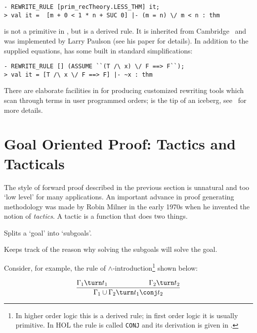 \begin{session}
\begin{verbatim}
- REWRITE_RULE [prim_recTheory.LESS_THM] it;
> val it =  [m + 0 < 1 * n + SUC 0] |- (m = n) \/ m < n : thm
\end{verbatim}
\end{session}

 is not a primitive in \HOL, but is a derived rule.
It is inherited from Cambridge \LCF\ and was implemented by Larry Paulson (see his paper \cite{lcp-rewrite} for details).
In addition to the supplied equations,  has some built in standard simplifications:

\begin{session}
\begin{verbatim}
- REWRITE_RULE [] (ASSUME ``(T /\ x) \/ F ==> F``);
> val it = [T /\ x \/ F ==> F] |- ~x : thm
\end{verbatim}
\end{session}

There are elaborate facilities in \HOL{} for producing customized rewriting tools which scan through terms in user programmed orders;  is the tip of an iceberg, see \DESCRIPTION\ for more details.

\section{Goal Oriented Proof: Tactics and Tacticals}
\label{backward}\label{tactics}

The style of forward proof described in the previous section is
unnatural and too `low level' for many applications. An important
advance in proof generating methodology was made by Robin Milner in
the early 1970s when he invented the notion of {\it tactics\/}. A
tactic is a function that does two things.
\begin{myenumerate}
\item Splits a `goal' into `subgoals'.
\item Keeps track of the reason why solving the subgoals will solve the goal.
\end{myenumerate}

\noindent Consider, for example, the  rule of $\wedge$-introduction\footnote{In
  higher order logic this is a derived rule; in first order logic it
  is usually primitive.  In HOL the rule is called {\tt CONJ} and its
  derivation is given in \DESCRIPTION.}  shown below:

\[ \frac{\Gamma_1\turn
t_1\qquad\qquad\qquad\Gamma_2\turn t_2}{\Gamma_1\cup\Gamma_2 \turn t_1\conj
t_2} \]


